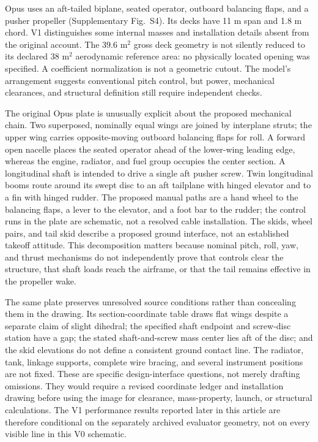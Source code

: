 \documentclass[10pt,letterpaper]{article}
\begin{document}
Opus uses an aft-tailed biplane, seated operator, outboard balancing flaps, and a pusher propeller (Supplementary Fig.~S4). Its decks have 11 m span and 1.8 m chord. V1 distinguishes some internal masses and installation details absent from the original account. The 39.6 m$^2$ gross deck geometry is not silently reduced to its declared 38 m$^2$ aerodynamic reference area: no physically located opening was specified. A coefficient normalization is not a geometric cutout. The model's arrangement suggests conventional pitch control, but power, mechanical clearances, and structural definition still require independent checks.



The original Opus plate is unusually explicit about the proposed mechanical chain. Two superposed, nominally equal wings are joined by interplane struts; the upper wing carries opposite-moving outboard balancing flaps for roll. A forward open nacelle places the seated operator ahead of the lower-wing leading edge, whereas the engine, radiator, and fuel group occupies the center section. A longitudinal shaft is intended to drive a single aft pusher screw. Twin longitudinal booms route around its swept disc to an aft tailplane with hinged elevator and to a fin with hinged rudder. The proposed manual paths are a hand wheel to the balancing flaps, a lever to the elevator, and a foot bar to the rudder; the control runs in the plate are schematic, not a resolved cable installation. The skids, wheel pairs, and tail skid describe a proposed ground interface, not an established takeoff attitude. This decomposition matters because nominal pitch, roll, yaw, and thrust mechanisms do not independently prove that controls clear the structure, that shaft loads reach the airframe, or that the tail remains effective in the propeller wake.

The same plate preserves unresolved source conditions rather than concealing them in the drawing. Its section-coordinate table draws flat wings despite a separate claim of slight dihedral; the specified shaft endpoint and screw-disc station have a gap; the stated shaft-and-screw mass center lies aft of the disc; and the skid elevations do not define a consistent ground contact line. The radiator, tank, linkage supports, complete wire bracing, and several instrument positions are not fixed. These are specific design-interface questions, not merely drafting omissions. They would require a revised coordinate ledger and installation drawing before using the image for clearance, mass-property, launch, or structural calculations. The V1 performance results reported later in this article are therefore conditional on the separately archived evaluator geometry, not on every visible line in this V0 schematic.
\end{document}
